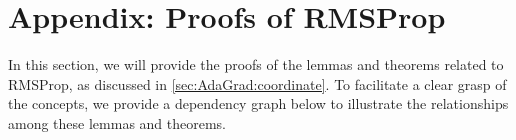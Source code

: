 \documentclass[standalone]{article}
\begin{document}
\section{Appendix: Proofs of RMSProp }\label{p_RMSProp}
In this section, we will provide the proofs of the lemmas and theorems related to RMSProp, as discussed in \cref{sec:AdaGrad:coordinate}. To facilitate a clear grasp of the concepts, we provide a dependency graph below to illustrate the relationships among these lemmas and theorems. 
\begin{figure}[omitted: a diagram of this paper's results, not reproduced here]\end{figure}
\end{document}
